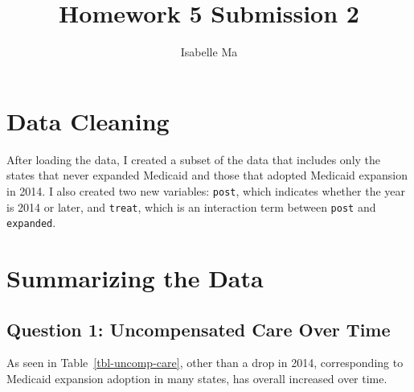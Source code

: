 \documentclass[
  letterpaper,
  DIV=11,
  numbers=noendperiod]{scrartcl}
\title{Homework 5 Submission 2}
\author{Isabelle Ma}
\date{}
\begin{document}
\maketitle


\section{Data Cleaning}\label{data-cleaning}

After loading the data, I created a subset of the data that includes
only the states that never expanded Medicaid and those that adopted
Medicaid expansion in 2014. I also created two new variables:
\texttt{post}, which indicates whether the year is 2014 or later, and
\texttt{treat}, which is an interaction term between \texttt{post} and
\texttt{expanded}.

\section{Summarizing the Data}\label{summarizing-the-data}

\subsection{Question 1: Uncompensated Care Over
Time}\label{question-1-uncompensated-care-over-time}

As seen in Table~\ref{tbl-uncomp-care}, other than a drop in 2014,
corresponding to Medicaid expansion adoption in many states, has overall
increased over time.

\begin{table}[H]

\caption{\label{tbl-uncomp-care}Average Uncompensated Care Charges Over
Time}


\end{table}%
\end{document}
